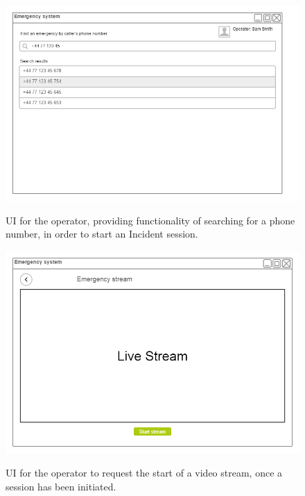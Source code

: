 \documentclass{article}
\begin{document}
	
	\begin{figure}[h]
		\centering
		\includegraphics[width=.9\textwidth]{"VideoStream/8"}

UI for the operator, providing functionality of searching for a phone number, in order to start an Incident session.
	\end{figure} 
	
	\begin{figure}[h]
		\centering
		\includegraphics[width=.9\textwidth]{"VideoStream/9"}

UI for the operator to request the start of a video stream, once a session has been initiated.
	\end{figure}\clearpage
	
\end{document}
